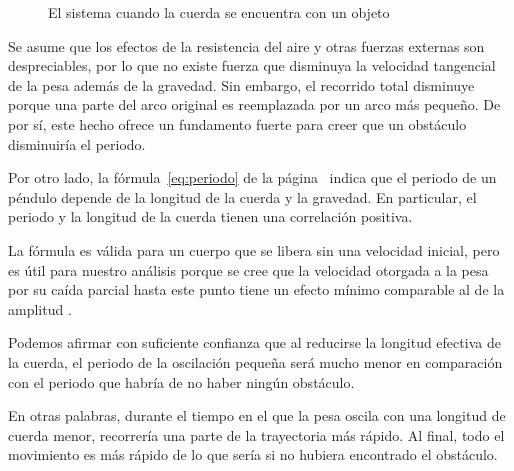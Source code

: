 \documentclass[twocolumn]{report}
\numberwithin{table}{section}
\begin{document}
\begin{figure}[h]
  \centering
  \caption{El sistema cuando la cuerda se encuentra con un objeto}
\end{figure}

Se asume que los efectos de la resistencia del aire y otras fuerzas
externas son despreciables, por lo que no existe fuerza que disminuya
la velocidad tangencial de la pesa además de la gravedad. Sin
embargo, el recorrido total disminuye porque una parte del arco
original es reemplazada por un arco más pequeño. De por sí, este
hecho ofrece un fundamento fuerte para creer que un obstáculo
disminuiría el periodo.

Por otro lado, la fórmula~\eqref{eq:periodo} de la
página~\pageref{eq:periodo} indica que el periodo de un péndulo
depende de la longitud de la cuerda y la gravedad. En particular, el
periodo y la longitud de la cuerda tienen una correlación positiva.

La fórmula es válida para un cuerpo que se libera sin una velocidad
inicial, pero es útil para nuestro análisis porque se cree que la velocidad
otorgada a la pesa por su caída parcial hasta este punto tiene un
efecto mínimo comparable al de la amplitud \alpha.

Podemos afirmar con suficiente confianza que al reducirse la longitud
efectiva de la cuerda, el periodo de la oscilación pequeña será mucho
menor en comparación con el periodo que habría de no haber ningún obstáculo.

En otras palabras, durante el tiempo en el que la pesa oscila con
una longitud de cuerda menor, recorrería una parte de la trayectoria
más rápido. Al final, todo el movimiento es más rápido de lo que
sería si no hubiera encontrado el obstáculo.
\end{document}
